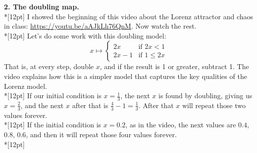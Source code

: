 \documentclass{exam}
\begin{document}
\textbf{2. The doubling map.}
\\*[12pt]
I showed the beginning of this video about the Lorenz attractor and chaos in
class: \href{https://youtu.be/aAJkLh76QnM}{https://youtu.be/aAJkLh76QnM}.
Now watch the rest.
\\*[12pt]
Let's do some work with this doubling model:
\[
  x \mapsto \begin{cases}2x&\text{if }2x<1 \\ 2x-1&\text{if }1\leq2x\end{cases}	
\]
That is, at every step, double $x$, and if the result is 1 or greater, subtract 1.
The video explains how this is a simpler model that captures the key qualities
of the Lorenz model.
\\*[12pt]
If our initial condition is $x=\frac13$, the next $x$ is found by doubling,
giving us $x=\frac23$, and the next $x$ after that is $\frac43-1=\frac13$.
After that $x$ will repeat those two values forever.
\\*[12pt]
If the initial condition is $x=0.2$, as in the video, the next values are
$0.4$, $0.8$, $0.6$, and then it will repeat those four values forever.
\\*[12pt]
\end{document}
